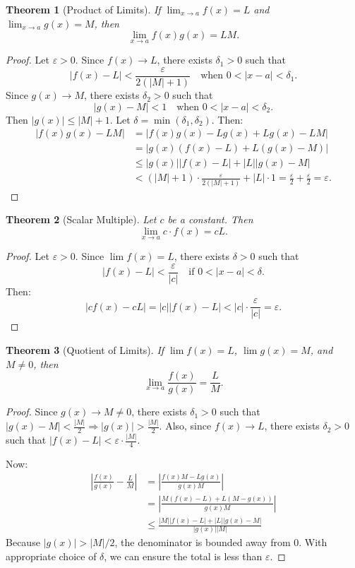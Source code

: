 \documentclass{article}
\newtheorem{theorem}{Theorem}
\begin{document}
\begin{theorem}[Product of Limits]
If $\lim_{x \to a} f(x) = L$ and $\lim_{x \to a} g(x) = M$, then
\[ \lim_{x \to a} f(x)g(x) = LM. \]
\end{theorem}

\begin{proof}
Let $\varepsilon > 0$. Since $f(x) \to L$, there exists $\delta_1 > 0$ such that
\[
|f(x) - L| < \frac{\varepsilon}{2(|M| + 1)} \quad \text{when } 0 < |x - a| < \delta_1.
\]
Since $g(x) \to M$, there exists $\delta_2 > 0$ such that
\[
|g(x) - M| < 1 \quad \text{when } 0 < |x - a| < \delta_2.
\]
Then $|g(x)| \leq |M| + 1$. Let $\delta = \min(\delta_1, \delta_2)$. Then:
\begin{align*}
|f(x)g(x) - LM| &= |f(x)g(x) - Lg(x) + Lg(x) - LM| \\
&= |g(x)(f(x) - L) + L(g(x) - M)| \\
&\leq |g(x)||f(x) - L| + |L||g(x) - M| \\
&< (|M| + 1)\cdot\frac{\varepsilon}{2(|M| + 1)} + |L|\cdot 1 = \frac{\varepsilon}{2} + \frac{\varepsilon}{2} = \varepsilon.
\end{align*}
\end{proof}

\begin{theorem}[Scalar Multiple]
Let $c$ be a constant. Then
\[ \lim_{x \to a} c\cdot f(x) = cL. \]
\end{theorem}

\begin{proof}
Let $\varepsilon > 0$. Since $\lim f(x) = L$, there exists $\delta > 0$ such that
\[
|f(x) - L| < \frac{\varepsilon}{|c|} \quad \text{if } 0 < |x - a| < \delta.
\]
Then:
\[
|cf(x) - cL| = |c||f(x) - L| < |c| \cdot \frac{\varepsilon}{|c|} = \varepsilon.
\]
\end{proof}

\begin{theorem}[Quotient of Limits]
If $\lim f(x) = L$, $\lim g(x) = M$, and $M \neq 0$, then
\[ \lim_{x \to a} \frac{f(x)}{g(x)} = \frac{L}{M}. \]
\end{theorem}

\begin{proof}
Since $g(x) \to M \neq 0$, there exists $\delta_1 > 0$ such that $|g(x) - M| < \frac{|M|}{2} \Rightarrow |g(x)| > \frac{|M|}{2}$. Also, since $f(x) \to L$, there exists $\delta_2 > 0$ such that $|f(x) - L| < \varepsilon \cdot \frac{|M|}{4}$. 

Now:
\begin{align*}
\left|\frac{f(x)}{g(x)} - \frac{L}{M}\right| &= \left|\frac{f(x)M - Lg(x)}{g(x)M}\right| \\
&= \left|\frac{M(f(x) - L) + L(M - g(x))}{g(x)M}\right| \\
&\leq \frac{|M||f(x) - L| + |L||g(x) - M|}{|g(x)||M|}
\end{align*}
Because $|g(x)| > |M|/2$, the denominator is bounded away from 0. With appropriate choice of $\delta$, we can ensure the total is less than $\varepsilon$.
\end{proof}
\end{document}

